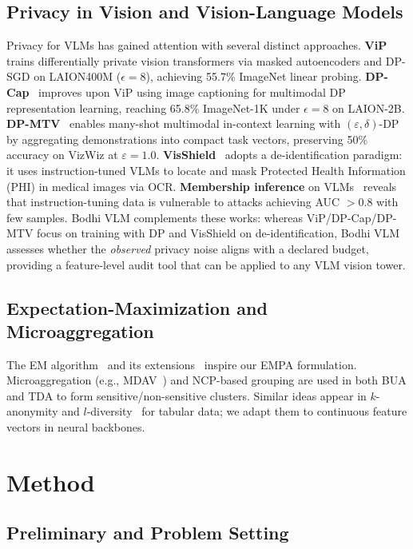 \documentclass[journal,transmag]{IEEEtran}
\begin{document}
\subsection{Privacy in Vision and Vision-Language Models}
\label{subsec:related-vlm}
Privacy for VLMs has gained attention with several distinct approaches. \textbf{ViP}~\cite{yu2024vip} trains differentially private vision transformers via masked autoencoders and DP-SGD on LAION400M ($\epsilon{=}8$), achieving 55.7\% ImageNet linear probing. \textbf{DP-Cap}~\cite{sander2024dpcap} improves upon ViP using image captioning for multimodal DP representation learning, reaching 65.8\% ImageNet-1K under $\epsilon{=}8$ on LAION-2B. \textbf{DP-MTV}~\cite{ngong2026dpmtv} enables many-shot multimodal in-context learning with $(\varepsilon,\delta)$-DP by aggregating demonstrations into compact task vectors, preserving 50\% accuracy on VizWiz at $\varepsilon{=}1.0$. \textbf{VisShield}~\cite{chen2025visshield} adopts a de-identification paradigm: it uses instruction-tuned VLMs to locate and mask Protected Health Information (PHI) in medical images via OCR. \textbf{Membership inference} on VLMs~\cite{hu2025vlmmia} reveals that instruction-tuning data is vulnerable to attacks achieving AUC $>0.8$ with few samples. Bodhi VLM complements these works: whereas ViP/DP-Cap/DP-MTV focus on training with DP and VisShield on de-identification, Bodhi VLM assesses whether the \emph{observed} privacy noise aligns with a declared budget, providing a feature-level audit tool that can be applied to any VLM vision tower.

\subsection{Expectation-Maximization and Microaggregation}
\label{subsec:related-em}
The EM algorithm~\cite{dempster-laird-rubin-77} and its extensions~\cite{em-converge,greff2017neural} inspire our EMPA formulation. Microaggregation (e.g., MDAV~\cite{soria2014enhancing}) and NCP-based grouping are used in both BUA and TDA to form sensitive/non-sensitive clusters. Similar ideas appear in $k$-anonymity and $l$-diversity~\cite{machanavajjhala2007diversity} for tabular data; we adapt them to continuous feature vectors in neural backbones.

\section{Method}
\label{sec:method}

\subsection{Preliminary and Problem Setting}
\label{subsec:preliminary}
\end{document}
